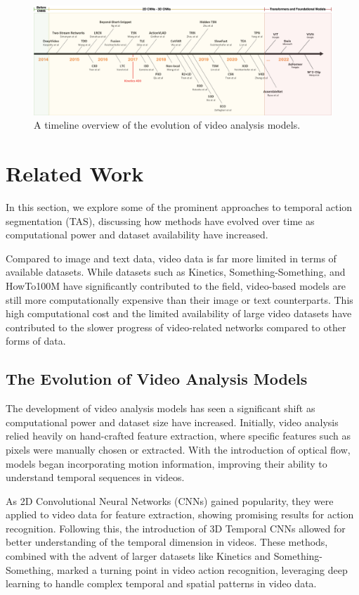\begin{figure}[t]
    \centering
    \includegraphics[width=\textwidth]{../../assets/figures/extended-video-timeline-v3.png}
    \caption{A timeline overview of the evolution of video analysis models.}
    \label{fig:your-label}
\end{figure}

\section{Related Work}

In this section, we explore some of the prominent approaches to temporal action segmentation (TAS), discussing how methods have evolved over time as computational power and dataset availability have increased.

Compared to image and text data, video data is far more limited in terms of available datasets. While datasets such as Kinetics, Something-Something, and HowTo100M have significantly contributed to the field, video-based models are still more computationally expensive than their image or text counterparts. This high computational cost and the limited availability of large video datasets have contributed to the slower progress of video-related networks compared to other forms of data.

\subsection{The Evolution of Video Analysis Models}

The development of video analysis models has seen a significant shift as computational power and dataset size have increased. Initially, video analysis relied heavily on hand-crafted feature extraction, where specific features such as pixels were manually chosen or extracted. With the introduction of optical flow, models began incorporating motion information, improving their ability to understand temporal sequences in videos.

As 2D Convolutional Neural Networks (CNNs) gained popularity, they were applied to video data for feature extraction, showing promising results for action recognition. Following this, the introduction of 3D Temporal CNNs allowed for better understanding of the temporal dimension in videos. These methods, combined with the advent of larger datasets like Kinetics and Something-Something, marked a turning point in video action recognition, leveraging deep learning to handle complex temporal and spatial patterns in video data.

